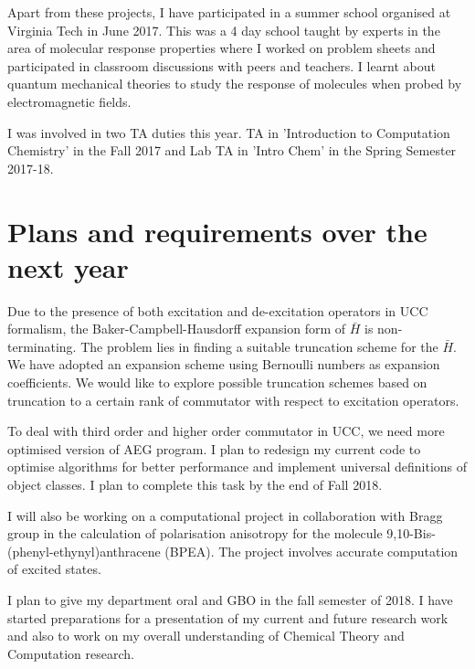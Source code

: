 \documentclass[11pt]{article}   	%
\begin{document}
Apart from these projects, I have participated in a summer school organised at Virginia Tech in June 2017. This was a 4 day school taught by experts in the area of molecular response properties where I worked on problem sheets and participated in classroom discussions with peers and teachers. I learnt about quantum mechanical theories to study the response of molecules when probed by electromagnetic fields.

I was involved in two TA duties this year. TA in 'Introduction to Computation Chemistry' in the Fall 2017 and Lab TA in 'Intro Chem' in the Spring Semester 2017-18.
\section{Plans and requirements over the next year}
Due to the presence of both excitation and de-excitation operators in UCC formalism, the Baker-Campbell-Hausdorff expansion form of $\bar{H}$ is non-terminating. The problem lies in finding a suitable truncation scheme for the $\bar{H}$. We have adopted an expansion scheme using Bernoulli numbers as expansion coefficients. We would like to explore possible truncation schemes based on truncation to a certain rank of commutator with respect to excitation operators. 

To deal with third order and higher order commutator in UCC, we need more optimised version of AEG program. I plan to redesign my current code to optimise  algorithms for better performance and implement universal definitions of object classes. I plan to complete this task by the end of Fall 2018. 

I will also be working on a computational project in collaboration with Bragg group in the calculation of polarisation anisotropy for the molecule 9,10-Bis-(phenyl-ethynyl)anthracene (BPEA). The project involves accurate computation of excited states.

I plan to give my department oral and GBO in the fall semester of 2018. I have started preparations for a presentation of my current and future research work and also to work on my overall understanding of Chemical Theory and Computation research. 
\end{document}
